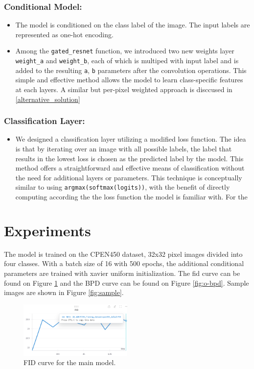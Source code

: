 \documentclass{article}
\begin{document}
    \subsubsection{Conditional Model:}
    \begin{itemize}
        \item The model is conditioned on the class label of the image. The input labels are represented as one-hot encoding.
        \item Among the \texttt{gated\_resnet} function, we introduced two new weights layer \texttt{weight\_a} and \texttt{weight\_b}, each of which is multiped with input label and is added to the resulting \texttt{a}, \texttt{b} parameters after the convolution operations. This simple and effective method allows the model to learn class-specific features at each layers. A similar but per-pixel weighted approach is disccused in \ref{alternative_solution}
     \end{itemize}

    \subsubsection{Classification Layer:}
    \begin{itemize}
        \item We designed a classification layer utilizing a modified loss function. The idea is that by iterating over an image with all possible labels, the label that results in the lowest loss is chosen as the predicted label by the model. This method offers a straightforward and effective means of classification without the need for additional layers or parameters. This technique is conceptually similar to using \texttt{argmax(softmax(logits))}, with the benefit of directly computing according the the loss function the model is familiar with. For the 
    \end{itemize}

\section{Experiments}
The model is trained on the CPEN450 dataset, 32x32 pixel images divided into four classes. With a batch size of 16 with 500 epochs, the additional conditional parameters are trained with xavier uniform initialization. The fid curve can be found on Figure \ref{fig:o-fid} and the BPD curve can be found on Figure \ref{fig:o-bpd}.
Sample images are shown in Figure \ref{fig:sample}.

\begin{figure}
    \centering
    \includegraphics[width=0.5\textwidth]{report_data/o-fid.png}
    \caption{ FID curve for the main model.}
    \label{fig:o-fid}
  \end{figure}
\end{document}
